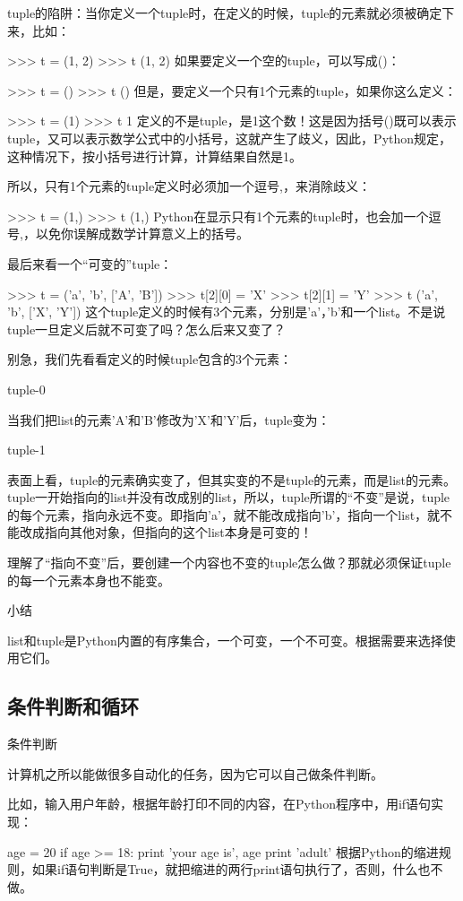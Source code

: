 tuple的陷阱：当你定义一个tuple时，在定义的时候，tuple的元素就必须被确定下来，比如：

>>> t = (1, 2)
>>> t
(1, 2)
如果要定义一个空的tuple，可以写成()：

>>> t = ()
>>> t
()
但是，要定义一个只有1个元素的tuple，如果你这么定义：

>>> t = (1)
>>> t
1
定义的不是tuple，是1这个数！这是因为括号()既可以表示tuple，又可以表示数学公式中的小括号，这就产生了歧义，因此，Python规定，这种情况下，按小括号进行计算，计算结果自然是1。

所以，只有1个元素的tuple定义时必须加一个逗号,，来消除歧义：

>>> t = (1,)
>>> t
(1,)
Python在显示只有1个元素的tuple时，也会加一个逗号,，以免你误解成数学计算意义上的括号。

最后来看一个“可变的”tuple：

>>> t = ('a', 'b', ['A', 'B'])
>>> t[2][0] = 'X'
>>> t[2][1] = 'Y'
>>> t
('a', 'b', ['X', 'Y'])
这个tuple定义的时候有3个元素，分别是'a'，'b'和一个list。不是说tuple一旦定义后就不可变了吗？怎么后来又变了？

别急，我们先看看定义的时候tuple包含的3个元素：

tuple-0

当我们把list的元素'A'和'B'修改为'X'和'Y'后，tuple变为：

tuple-1

表面上看，tuple的元素确实变了，但其实变的不是tuple的元素，而是list的元素。tuple一开始指向的list并没有改成别的list，所以，tuple所谓的“不变”是说，tuple的每个元素，指向永远不变。即指向'a'，就不能改成指向'b'，指向一个list，就不能改成指向其他对象，但指向的这个list本身是可变的！

理解了“指向不变”后，要创建一个内容也不变的tuple怎么做？那就必须保证tuple的每一个元素本身也不能变。

小结

list和tuple是Python内置的有序集合，一个可变，一个不可变。根据需要来选择使用它们。

\subsection{条件判断和循环}
条件判断

计算机之所以能做很多自动化的任务，因为它可以自己做条件判断。

比如，输入用户年龄，根据年龄打印不同的内容，在Python程序中，用if语句实现：

age = 20
if age >= 18:
    print 'your age is', age
    print 'adult'
根据Python的缩进规则，如果if语句判断是True，就把缩进的两行print语句执行了，否则，什么也不做。

